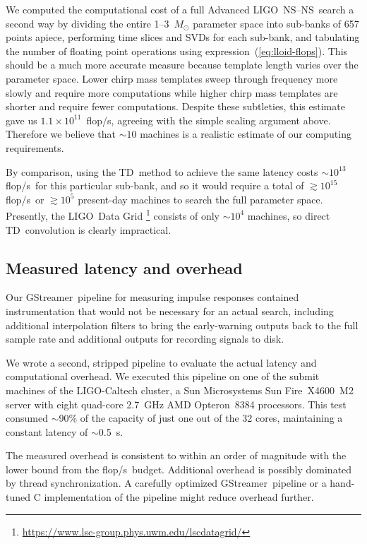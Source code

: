 \documentclass[preprint2]{aastex}
\newcommand{\NS}{NS}
\newcommand{\LIGO}{LIGO}%
\newcommand{\flops}{flop/s}
\newcommand{\gstreamer}{GStreamer}
\newcommand{\TD}{TD}%
\begin{document}
We computed the computational cost of a full Advanced \LIGO\ \NS--\NS\ search a
second way by dividing the entire 1--3~$M_\odot$ parameter space into sub-banks
of 657 points apiece, performing time slices and SVDs for each sub-bank, and
tabulating the number of floating point operations using
expression~(\ref{eq:lloid-flops}).  This should be a much more accurate measure
because template length varies over the parameter space.  Lower chirp mass
templates sweep through frequency more slowly and require more computations
while higher chirp mass templates are shorter and require fewer computations.
Despite these subtleties, this estimate gave us $1.1 \times 10^{11}$~\flops,
agreeing with the simple scaling argument above.  Therefore we believe that
$\sim$$10$ machines is a realistic estimate of our computing requirements.

By comparison, using the \TD\ method to achieve the same latency costs
$\sim$$10^{13}$ \flops\ for this particular sub-bank, and so it would require
a total of $\gtrsim$$10^{15}$ \flops\ or $\gtrsim$$10^5$ present-day machines
to search the full parameter space.  Presently, the \LIGO\ Data Grid%
\footnote{\url{https://www.lsc-group.phys.uwm.edu/lscdatagrid/}} consists of
only $\sim$$10^4$ machines, so direct \TD\ convolution is clearly impractical.

\subsection{Measured latency and overhead}

Our \gstreamer\ pipeline for measuring impulse responses contained
instrumentation that would not be necessary for an actual search, including
additional interpolation filters to bring the early-warning outputs back to the
full sample rate and additional outputs for recording signals to disk.

We wrote a second, stripped pipeline to evaluate the actual latency and
computational overhead.  We executed this pipeline on one of the submit
machines of the \LIGO-Caltech cluster, a Sun Microsystems Sun
Fire\texttrademark\ X4600~M2 server with eight quad-core 2.7~GHz AMD
Opteron\texttrademark\ 8384 processors.  This test consumed $\sim$90\% of the
capacity of just one out of the 32 cores, maintaining a constant latency of
$\sim$0.5~s.

The measured overhead is consistent to within an order of magnitude with the
lower bound from the \flops\ budget.  Additional overhead is possibly
dominated by thread synchronization.  A carefully optimized \gstreamer\
pipeline or a hand-tuned C implementation of the pipeline might reduce overhead
further.
\end{document}
